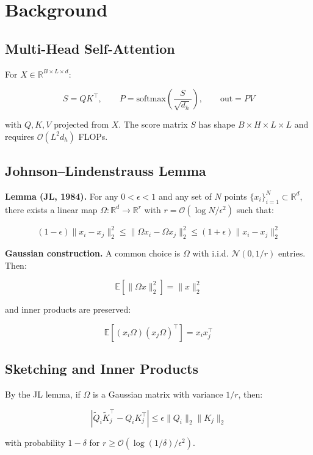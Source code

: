 
\section{Background}

\subsection{Multi-Head Self-Attention}

For $X \in \mathbb{R}^{B \times L \times d}$:

\[
S = Q K^\top, \qquad
P = \text{softmax}\!\left(\frac{S}{\sqrt{d_h}}\right), \qquad
\text{out} = P V
\tag{3.1}
\]

with $Q, K, V$ projected from $X$. The score matrix $S$ has shape 
$B \times H \times L \times L$ and requires $\mathcal{O}(L^2 d_h)$ FLOPs.

\subsection{Johnson--Lindenstrauss Lemma}

\textbf{Lemma (JL, 1984).} For any $0 < \epsilon < 1$ and any set of $N$ points 
$\{x_i\}_{i=1}^N \subset \mathbb{R}^d$, there exists a linear map 
$\Omega : \mathbb{R}^d \to \mathbb{R}^r$ with 
$r = \mathcal{O}(\log N / \epsilon^2)$ such that:

\[
(1 - \epsilon) \|x_i - x_j\|_2^2 \leq \|\Omega x_i - \Omega x_j\|_2^2 \leq (1 + \epsilon) \|x_i - x_j\|_2^2
\tag{3.2}
\]

\textbf{Gaussian construction.} A common choice is $\Omega$ with i.i.d. 
$\mathcal{N}(0, 1/r)$ entries. Then:

\[
\mathbb{E}[\|\Omega x\|_2^2] = \|x\|_2^2
\tag{3.3}
\]

and inner products are preserved:

\[
\mathbb{E}[(x_i \Omega)(x_j \Omega)^\top] = x_i x_j^\top
\tag{3.4}
\]

\subsection{Sketching and Inner Products}

By the JL lemma, if $\Omega$ is a Gaussian matrix with variance $1/r$, then:

\[
|\tilde{Q}_i \tilde{K}_j^\top - Q_i K_j^\top| \leq \epsilon \|Q_i\|_2 \|K_j\|_2
\tag{3.5}
\]

with probability $1 - \delta$ for $r \geq \mathcal{O}(\log(1/\delta) / \epsilon^2)$.

